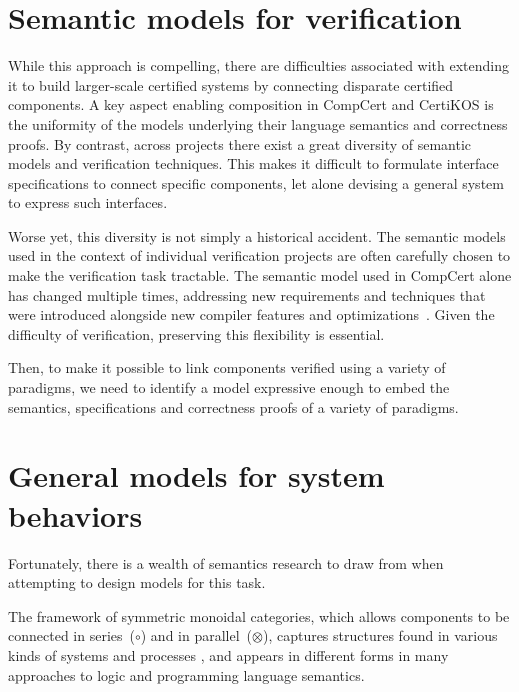 \documentclass[draft,11pt]{report}
\begin{document}

\section{Semantic models for verification} %
\label{ssec:semant}

While this approach is compelling,
there are difficulties associated with extending it
to build larger-scale certified systems
by connecting disparate certified components.
A key aspect enabling composition in CompCert and CertiKOS
is the uniformity of the models underlying
their language semantics and correctness proofs.
By contrast,
across projects
there exist a great diversity
of semantic models and verification techniques.
This makes it difficult to formulate
interface specifications to connect specific components,
let alone devising a general system
to express such interfaces.

Worse yet,
this diversity is not simply a historical accident.
The semantic models
used in the context of individual verification projects
are often carefully chosen
to make the verification task tractable.
The semantic model used in CompCert alone
has changed multiple times,
addressing new requirements and techniques
that were introduced alongside
new compiler features and optimizations~\cite{compsem}.
Given the difficulty of verification,
preserving this flexibility is essential.

Then,
to make it possible to link components
verified using a variety of paradigms,
we need to identify a model
expressive enough to embed
the semantics, specifications and correctness proofs
of a variety of paradigms.


\section{General models for system behaviors} %
\label{ssec:genmodel}

Fortunately,
there is a wealth of semantics research to draw from
when attempting to design models for this task.

The framework of
symmetric monoidal categories,
which allows components to be
connected in series~($\circ$) and in parallel~($\otimes$),
captures structures found
in various kinds of systems and processes \cite{rosetta},
and appears in different forms
in many approaches to logic and programming language semantics.
\end{document}
